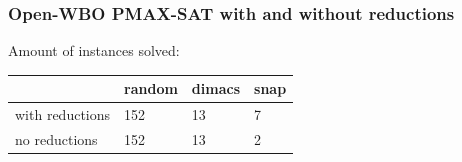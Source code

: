 \documentclass{beamer}[12pt]
\begin{document}
%			
%		
%	
	
	\begin{frame}
		\frametitle{Open-WBO PMAX-SAT with and without reductions}
			\begin{center}
				Amount of instances solved: \\ \vspace{4mm}
				\begin{tabular}{| l | l | l | l |}
					\hline
					& random & dimacs & snap \\ \hline
					with reductions & 152 & 13 & 7 \\ \hline
					no reductions & 152 & 13 & 2 \\ \hline
				\end{tabular}
			\end{center}
	\end{frame}
	
\end{document}
